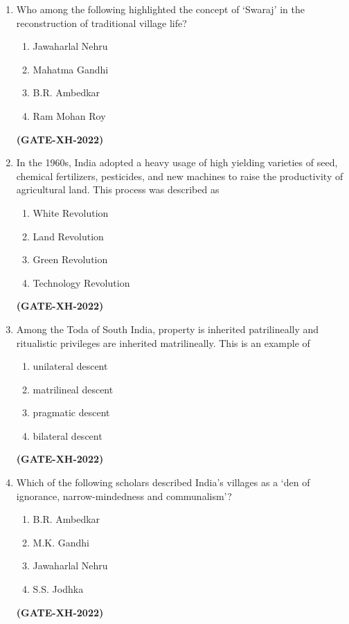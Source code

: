 \documentclass[journal]{IEEEtran}
\begin{document}
\begin{enumerate}
\item
Who among the following highlighted the concept of ‘Swaraj’ in the reconstruction of traditional village life?
\begin{multicols}{2}
\begin{enumerate}
\item Jawaharlal Nehru
\item Mahatma Gandhi
\item B.R. Ambedkar
\item Ram Mohan Roy
\end{enumerate}
\end{multicols}
\hfill\textbf{(GATE-XH-2022)}

\item
In the 1960s, India adopted a heavy usage of high yielding varieties of seed, chemical fertilizers, pesticides, and new machines to raise the productivity of agricultural land. This process was described as
\begin{multicols}{2}
\begin{enumerate}
\item White Revolution
\item Land Revolution
\item Green Revolution
\item Technology Revolution
\end{enumerate}
\end{multicols}
\hfill\textbf{(GATE-XH-2022)}

\item
Among the Toda of South India, property is inherited patrilineally and ritualistic privileges are inherited matrilineally. This is an example of
\begin{multicols}{2}
\begin{enumerate}
\item unilateral descent
\item matrilineal descent
\item pragmatic descent
\item bilateral descent
\end{enumerate}
\end{multicols}
\hfill\textbf{(GATE-XH-2022)}

\item
Which of the following scholars described India’s villages as a ‘den of ignorance, narrow-mindedness and communalism’?
\begin{multicols}{2}
\begin{enumerate}
\item B.R. Ambedkar
\item M.K. Gandhi
\item Jawaharlal Nehru
\item S.S. Jodhka
\end{enumerate}
\end{multicols}
\hfill\textbf{(GATE-XH-2022)}


\end{enumerate}
\end{document}
